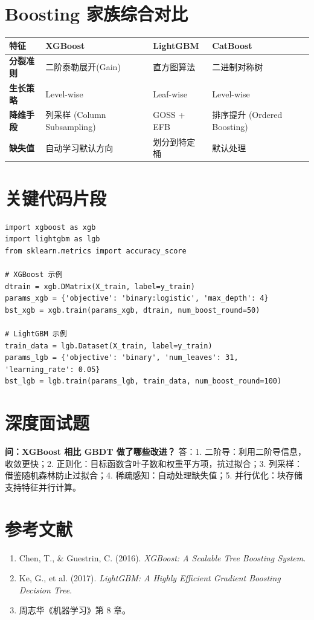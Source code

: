 \documentclass[12pt, a4paper]{article}
\begin{document}
\section{Boosting 家族综合对比}
\begin{table}[h]
\centering
\begin{tabularx}{\textwidth}{|l|X|X|X|}
\hline
\textbf{特征} & \textbf{XGBoost} & \textbf{LightGBM} & \textbf{CatBoost} \\
\hline
\textbf{分裂准则} & 二阶泰勒展开(Gain) & 直方图算法 & 二进制对称树 \\
\hline
\textbf{生长策略} & Level-wise & Leaf-wise & Level-wise \\
\hline
\textbf{降维手段} & 列采样 (Column Subsampling) & GOSS + EFB & 排序提升 (Ordered Boosting) \\
\hline
\textbf{缺失值} & 自动学习默认方向 & 划分到特定桶 & 默认处理 \\
\hline
\end{tabularx}
\end{table}

\section{关键代码片段}
\begin{lstlisting}
import xgboost as xgb
import lightgbm as lgb
from sklearn.metrics import accuracy_score

# XGBoost 示例
dtrain = xgb.DMatrix(X_train, label=y_train)
params_xgb = {'objective': 'binary:logistic', 'max_depth': 4}
bst_xgb = xgb.train(params_xgb, dtrain, num_boost_round=50)

# LightGBM 示例
train_data = lgb.Dataset(X_train, label=y_train)
params_lgb = {'objective': 'binary', 'num_leaves': 31, 'learning_rate': 0.05}
bst_lgb = lgb.train(params_lgb, train_data, num_boost_round=100)
\end{lstlisting}

\section{深度面试题}
\textbf{问：XGBoost 相比 GBDT 做了哪些改进？}
答：1. 二阶导：利用二阶导信息，收敛更快；2. 正则化：目标函数含叶子数和权重平方项，抗过拟合；3. 列采样：借鉴随机森林防止过拟合；4. 稀疏感知：自动处理缺失值；5. 并行优化：块存储支持特征并行计算。

\section{参考文献}
\begin{enumerate}
    \item Chen, T., & Guestrin, C. (2016). \textit{XGBoost: A Scalable Tree Boosting System}.
    \item Ke, G., et al. (2017). \textit{LightGBM: A Highly Efficient Gradient Boosting Decision Tree}.
    \item 周志华《机器学习》第 8 章。
\end{enumerate}
\end{document}
